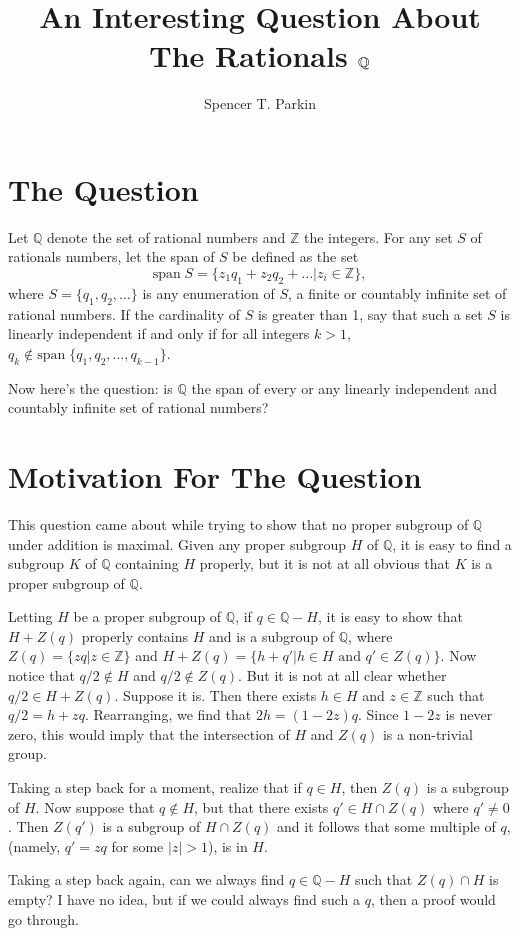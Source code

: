 \documentclass[12pt]{article}
\title{An Interesting Question About\\The Rationals $\Q$}
\author{Spencer T. Parkin}
\newcommand{\Q}{\mathbb{Q}}
\newcommand{\Z}{\mathbb{Z}}
\newcommand{\spn}{\mbox{span}\;}
\begin{document}
\maketitle

\section*{The Question}

Let $\Q$ denote the set of rational numbers and $\Z$ the integers.
For any set $S$ of rationals numbers, let the span of $S$ be defined as the set
\begin{equation*}
\spn S = \{z_1q_1+z_2q_2+\dots|z_i\in\Z\},
\end{equation*}
where $S=\{q_1,q_2,\dots\}$ is any enumeration of $S$, a finite
or countably infinite set of rational numbers.
If the cardinality of $S$ is greater than 1, say that such a set $S$ is
linearly independent if and only if for all
integers $k>1$, $q_k\not\in\spn\{q_1,q_2,\dots,q_{k-1}\}$.

Now here's the question: is $\Q$ the span of every or any linearly
independent and countably infinite set of rational numbers?

\section*{Motivation For The Question}

This question came about while trying to show that no proper subgroup
of $\Q$ under addition is maximal.  Given any proper subgroup $H$ of $\Q$,
it is easy to find a subgroup $K$ of $\Q$ containing $H$ properly, but it is
not at all obvious that $K$ is a proper subgroup of $\Q$.

Letting $H$ be a proper subgroup of $\Q$, if $q\in\Q-H$, it is easy to show that $H+Z(q)$
properly contains $H$ and is a subgroup of $\Q$, where
$Z(q)=\{zq|z\in\Z\}$ and $H+Z(q)=\{h+q'|\mbox{$h\in H$ and $q'\in Z(q)$}\}$.
Now notice that $q/2\not\in H$ and $q/2\not\in Z(q)$.
But it is not at all clear whether $q/2\in H+Z(q)$.  Suppose it is.
Then there exists $h\in H$ and $z\in\Z$ such that $q/2=h+zq$.
Rearranging, we find that $2h=(1-2z)q$.  Since $1-2z$ is never zero, this would imply that
the intersection of $H$ and $Z(q)$ is a non-trivial group.

Taking a step back for a moment, realize that if $q\in H$,
then $Z(q)$ is a subgroup of $H$.  Now suppose that $q\not\in H$,
but that there exists $q'\in H\cap Z(q)$ where $q'\neq 0$.
Then $Z(q')$ is a subgroup of $H\cap Z(q)$ and it follows that
some multiple of $q$, (namely, $q'=zq$ for some $|z|>1$), is in $H$.

Taking a step back again, can we always find $q\in\Q-H$ such that
$Z(q)\cap H$ is empty?  I have no idea, but if we could always find
such a $q$, then a proof would go through.
\end{document}
